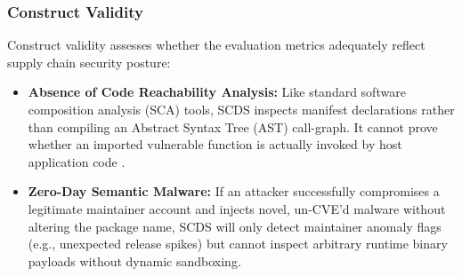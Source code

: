 \subsubsection{Construct Validity}
Construct validity assesses whether the evaluation metrics adequately reflect supply chain security posture:
\begin{itemize}
    \item \textbf{Absence of Code Reachability Analysis:} Like standard software composition analysis (SCA) tools, SCDS inspects manifest declarations rather than compiling an Abstract Syntax Tree (AST) call-graph. It cannot prove whether an imported vulnerable function is actually invoked by host application code \cite{jiang2025sbom}.
    \item \textbf{Zero-Day Semantic Malware:} If an attacker successfully compromises a legitimate maintainer account and injects novel, un-CVE'd malware without altering the package name, SCDS will only detect maintainer anomaly flags (e.g., unexpected release spikes) but cannot inspect arbitrary runtime binary payloads without dynamic sandboxing.
\end{itemize}
